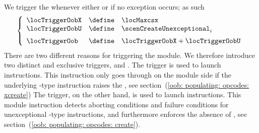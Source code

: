 We trigger the \oobMod{} whenever either \maxcsxSH{} or if no exception occurs; as such
\[
	\left\{ \begin{array}{lcl}
		\locTriggerOobX & \define & \locMaxcsx                                     \\
		\locTriggerOobU & \define & \scenCreateUnexceptional _{i}     \vspace{2mm} \\
		\locTriggerOob  & \define & \locTriggerOobX + \locTriggerOobU              \\
	\end{array} \right.
\]
\saNote{}
There are two different reasons for triggering the \oobMod{} module.
We therefore introduce two distinct and exclusive \oobMod{} triggers,
\locTriggerOobX{} and
\locTriggerOobU{}.
The \locTriggerOobX{} trigger is used to launch \oobInstXcreate{} instructions.
This instruction only goes through on the \oobMod{} module side if the underlying -type instruction raises the \maxcsxSH{},
see section~(\ref{oob: populating: opcodes: xcreate})
The \locTriggerOobU{} trigger, on the other hand, is used to launch \oobInstCreate{} instructions.
This \oobMod{} module instruction detects aborting conditions and failure conditions for unexceptional -type instructions,
and furthermore enforces the absence of \maxcsxSH{},
see section~(\ref{oob: populating: opcodes: create}).
